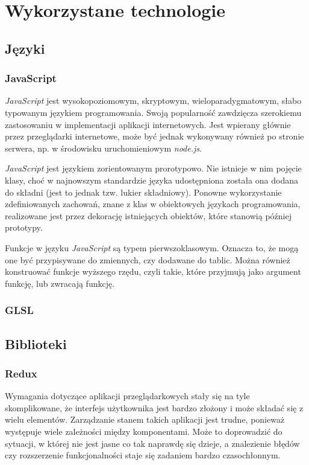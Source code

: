 \documentclass[12pt,a4paper,polish,thesis]{dcsbook}
\begin{document}
{	\section{Wykorzystane technologie}

	\subsection{Języki}

	\subsubsection{JavaScript}
	
	\textit{JavaScript} jest wysokopoziomowym, skryptowym, wieloparadygmatowym, słabo typowanym językiem programowania. Swoją popularność zawdzięcza szerokiemu zastosowaniu w implementacji aplikacji internetowych. Jest wpierany głównie przez przeglądarki internetowe, może być jednak wykonywany również po stronie serwera, np. w środowisku uruchomieniowym \textit{node.js}.
	
	\textit{JavaScript} jest językiem zorientowanym prorotypowo. Nie istnieje w nim pojęcie klasy, choć w najnowszym standardzie języka udostępniona została ona dodana do składni (jest to jednak tzw. lukier składniowy). Ponowne wykorzystanie zdefiniowanych zachowań, znane z klas w obiektowych językach programowania, realizowane jest przez dekorację istniejących obiektów, które stanowią później prototypy.
	
	Funkcje w języku \textit{JavaScript} są typem pierwszoklasowym. Oznacza to, że mogą one być przypisywane do zmiennych, czy dodawane do tablic. Można również konstruować funkcje wyższego rzędu, czyli takie, które przyjmują jako argument funkcję, lub zwracają funkcję.

	\subsubsection{GLSL}

	\subsection{Biblioteki}

	\subsubsection{Redux} \label{Redux}

	Wymagania dotyczące aplikacji przeglądarkowych stały się na tyle skomplikowane, że interfejs użytkownika jest bardzo złożony i może składać się z wielu elementów. Zarządzanie stanem takich aplikacji jest trudne, ponieważ występuje wiele zależności między komponentami. Może to doprowadzić do sytuacji, w której nie jest jasne co tak naprawdę się dzieje, a znalezienie błędów czy rozszerzenie funkcjonalności staje się zadaniem bardzo czasochłonnym.

}
\end{document}
